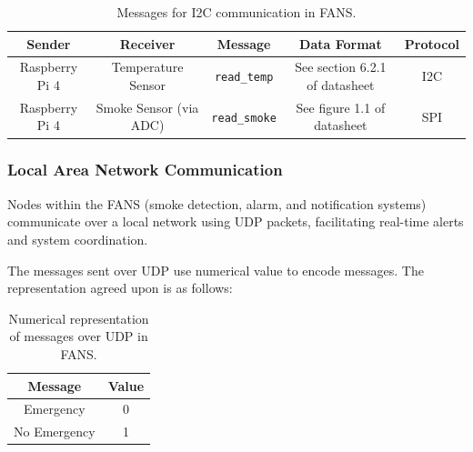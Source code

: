 \begin{table}[H]
    \centering
    \begin{tabular}{| c | c | c | c | c |}
        \hline
        Sender         & Receiver               & Message              & Data Format                                          & Protocol                 \\
        \hline
        Raspberry Pi 4 & Temperature Sensor     & \texttt{read\_temp}  & See section 6.2.1 of datasheet \cite{temp-datasheet} & I2C                      \\
        \hline
        Raspberry Pi 4 & Smoke Sensor (via ADC) & \texttt{read\_smoke} & See figure 1.1 of datasheet \cite{adc-datasheet}     & SPI \cite{adc-datasheet} \\
        \hline
    \end{tabular}
    \caption{Messages for I2C communication in FANS.}
\end{table}

\subsubsection{Local Area Network Communication}

Nodes within the FANS (smoke detection, alarm, and notification systems) communicate over a local network using UDP
packets, facilitating real-time alerts and system coordination.

The messages sent over UDP use numerical value to encode messages. The representation agreed upon is as follows:

\begin{table}[H]
    \centering
    \begin{tabular}{| c | c |}
        \hline
        Message      & Value \\
        \hline
        Emergency    & 0     \\
        \hline
        No Emergency & 1     \\
        \hline
    \end{tabular}
    \caption{Numerical representation of messages over UDP in FANS.}
\end{table}

